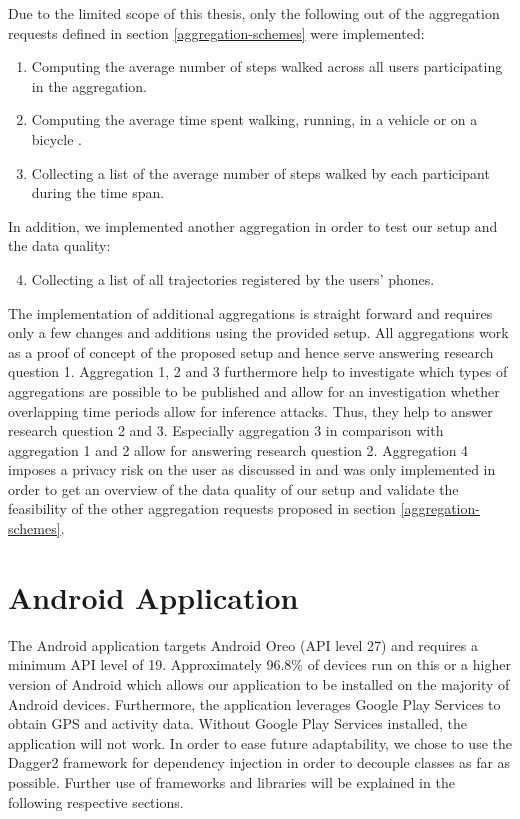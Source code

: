 \begin{samepage}
Due to the limited scope of this thesis, only the following out of the aggregation requests defined in section \ref{aggregation-schemes} were implemented:
\begin{enumerate}
	\item Computing the average number of steps walked across all users participating in the aggregation.
	\item Computing the average time spent walking, running, in a vehicle or on a bicycle \parencite{detected-activity}.
	\item Collecting a list of the average number of steps walked by each participant during the time span.
\end{enumerate}

In addition, we implemented another aggregation in order to test our setup and the data quality:
\begin{enumerate}
  \setcounter{enumi}{3}
  \item Collecting a list of all trajectories registered by the users' phones.
\end{enumerate}
\end{samepage}

The implementation of additional aggregations is straight forward and requires only a few changes and additions using the provided setup. All aggregations work as a proof of concept of the proposed setup and hence serve answering research question 1. Aggregation 1, 2 and 3 furthermore help to investigate which types of aggregations are possible to be published and allow for an investigation whether overlapping time periods allow for inference attacks. Thus, they help to answer research question 2 and 3. Especially aggregation 3 in comparison with aggregation 1 and 2 allow for answering research question 2.
Aggregation 4 imposes a privacy risk on the user as discussed in \parencite{twitter, cellphone, krumm} and was only implemented in order to get an overview of the data quality of our setup and validate the feasibility of the other aggregation requests proposed in section \ref{aggregation-schemes}.

\section{Android Application}\label{android-app}
The Android application targets Android Oreo (API level 27) and requires a minimum API level of 19. Approximately 96.8\% of devices run on this or a higher version of Android \cite{android-api-level-share} which allows our application to be installed on the majority of Android devices.
Furthermore, the application leverages Google Play Services to obtain GPS and activity data. Without Google Play Services installed, the application will not work. In order to ease future adaptability, we chose to use the Dagger2 framework \parencite{dagger} for dependency injection in order to decouple classes as far as possible. Further use of frameworks and libraries will be explained in the following respective sections.

